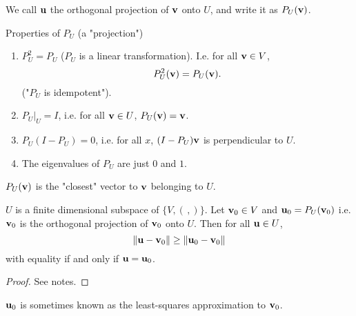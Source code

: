 \documentclass[10pt, a4paper]{article}
\begin{document}
We call $\mathbf{u}$ the orthogonal projection of $\mathbf{v}$ onto $U$,
and write it as $P_{U}(\mathbf{v})$.

\begin{proposition}
    Properties of $P_{U}$
    (a "projection")
    \begin{enumerate}[label = (\roman*)]
        \item $P_{U} ^ 2 = P_{U}$
        ($P_{U}$ is a linear transformation).
        I.e.
        for all $\mathbf{v} \in V$,
        \[
        P_{U} ^ 2(\mathbf{v}) = P_{U}(\mathbf{v}).
        \]
        ("$P_{U}$ is idempotent").

        \item $P_{U}|_{U} = I$,
        i.e. for all $\mathbf{v} \in U$,
        $P_{U}(\mathbf{v}) = \mathbf{v}$.

        \item $P_{U}(I - P_{U}) = 0$,
        i.e. for all $x$,
        $(I - P_{U})\mathbf{v}$ is perpendicular to $U$.

        \item The eigenvalues of $P_{U}$ are just $0$ and $1$.
    \end{enumerate}
\end{proposition}

\begin{remark}
    $P_{U}(\mathbf{v})$ is the "closest" vector to $\mathbf{v}$ belonging to $U$.
\end{remark}

\begin{proposition}
    $U$ is a finite dimensional subspace of $\{V, (\,,)\}$.
    Let $\mathbf{v}_0 \in V$ and $\mathbf{u}_0 = P_{U}(\mathbf{v}_0)$ i.e. $\mathbf{v}_0$ is the orthogonal projection of $\mathbf{v}_0$ onto $U$.
    Then for all $\mathbf{u} \in U$,
    \[
    \|\mathbf{u} - \mathbf{v}_0\| \geq \|\mathbf{u}_0 - \mathbf{v}_0\|
    \]
    with equality if and only if $\mathbf{u} = \mathbf{u}_0$.

    \begin{proof}
        See notes.
    \end{proof}
\end{proposition}

\begin{remark}
    $\mathbf{u}_0$ is sometimes known as the least-squares approximation to $\mathbf{v}_0$.
\end{remark}
\end{document}
